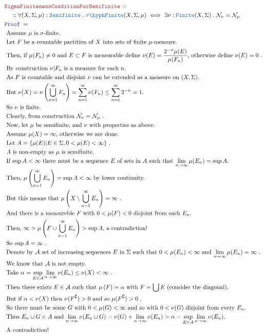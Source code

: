 \documentclass[12pt]{scrartcl}
\newcommand{\TYPE}[1]{\textcolor{NavyBlue}{\mathtt{#1}}}
\newcommand{\LOGIC}[1]{\textcolor{Blue}{\mathtt{#1}}}
\newcommand{\THM}[1]{\textcolor{Maroon}{\mathtt{#1}}}
\renewcommand{\.}{\; . \;}
\newcommand{\Theorem}[2]{& \THM{#1} \, :: \, #2 \\ & \Proof = \\ }
\newcommand{\NewLine}{\\ & \kern 1pc}
\newcommand{\Page}[1]{ \begin{align*} #1 \end{align*}   }
\renewcommand{\c}{\complement}
\newcommand{\Proof}{\LOGIC{Proof} \; }
\newcommand{\Explain}[1]{& \text{#1.} \\}
\newcommand{\Exclaim}[1]{& \text{#1!} \\}
\newcommand{\Finite}{\TYPE{Finite}}
\newcommand{\A}{\mathcal{A}}
\newcommand{\Null}{\mathcal{N}}
\newcommand{\sFinite}{\TYPE{\sigma \hyph  Finite}}
\newcommand{\Semifinite}{\TYPE{Semifinite}}
\begin{document}
\Page{
	\Theorem{SigmaFinitenessConditionForSemifinite}
	{
		\NewLine ::		
		\forall (X,\Sigma,\mu) : \Semifinite \.
		\sFinite(X,\Sigma,\mu)
		\iff
		\exists  \nu : \Finite(X,\Sigma) \.
		\Null_\nu = \Null_\mu
	}
	\Explain{
		Assume $\mu$ is $\sigma$-finite}
	\Explain{
		Let $F$ be a countable partition of $X$ into sets of finite $\mu$-measure}
	\Explain{
		Then, if $\mu(F_n) \neq 0$ and $E \subset F$ is measurable 
		define $\nu(E) = \frac{2^{-n}\mu(E)}{\mu(F_n)}$, otherwise define $\nu(E) = 0$
	}
	\Explain{
		By construction $\nu |F_n$ is a measure for each $n$}
	\Explain{
		As $F$ is countable and disjoint $\nu$ can be extended as a measure on
		$(X,\Sigma)$}
	\Explain{ 
		But
		$
			\nu(X) = \nu\left( \bigcup^\infty_{n=1} F_n \right) =
			\sum^\infty_{n=1} \nu(F_n) \le 
			\sum^\infty_{n=1}   2^{-n} = 1
		$}
	\Explain{
		So $\nu$ is finite}
	\Explain{
		Clearly, from construction $\Null_\nu = \Null_\mu$
	}
	\Explain{
		Now, let $\mu$ be semifinite, and $\nu$ with properties as above}
	\Explain{
		Assume $\mu(X) = \infty$, otherwise we are done}
	\Explain{
		Let $A = \{ \mu(E) | E \in \Sigma, 0 < \mu(E) < \infty \}$ }
	\Explain{
		$A$ is non-empty as $\mu$ is semifinite}
	\Explain{
		If $\sup A < \infty$ there must be a sequence $E$ of sets in $A$
		such that $\lim_{n\to \infty} \mu(E_n) = \sup A$}
	\Explain{
		Then, $\mu\left( \bigcup^\infty_{n=1} E_n \right) = \sup A < \infty$
		by lower continuity}
	\Explain{
		But this means that $\mu\left(X \setminus \bigcup^\infty_{n=1} E_n \right) = \infty$
	}
	\Explain{
		And there is a measureble $F$ with $0 < \mu(F) < 0$ disjoint from each $E_n$}
	\Exclaim{
		Then, $\infty > \mu\left( F \cup \bigcup^\infty_{n=1} E_n  \right) > \sup A$,
		a contradiction}
	\Explain{
		So  $\sup A = \infty$
	}
	\Explain{
		Denote by $\A$ set of increasing sequences $E$ in $\Sigma$ such that
		$0 < \mu(E_n) < \infty$ and $\lim_{n \to \infty} \mu(E_n) = \infty$
	}
	\Explain{
		We know that $\A$ is not empty}
	\Explain{
		Take $\alpha = \sup_{E \in \A} \lim_{n \to \infty} \nu(E_n) \le \nu(X) < \infty$
	}
	\Explain{
		Then there exists $E \in \A$ such that $\mu\left( F \right) = \alpha$ with $F = \bigcup E$
		 (consider the diagonal)}
	\Explain{
		But if $\alpha < \nu(X)$ then $\nu(F^\c) > 0$ and so $\mu(F^\c) > 0$		
	}
	\Explain{
		So there must be some $G$ with $0 < \mu(G) < \infty$ and so with $0 < \nu(G)$
	disjoint from every $E_n$}
	\Explain{
		Thus $E_n \cup G \in A$ and $\lim_{n \to \infty} \nu(E_n \cup G) = \nu(G) + \lim_{n \to \infty} \nu(E_n)
		> \alpha =  \sup_{E \in \A} \lim_{n \to \infty} \nu(E_n) $}
	\Exclaim{
		A contradiction}
}
\end{document}
